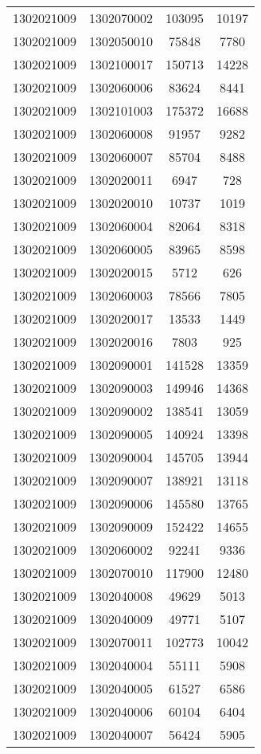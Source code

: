 \begin{longtable}[h]{llcc}
		1302021009 & 1302070002 & 103095 & 10197\\
		1302021009 & 1302050010 & 75848 & 7780\\
		1302021009 & 1302100017 & 150713 & 14228\\
		1302021009 & 1302060006 & 83624 & 8441\\
		1302021009 & 1302101003 & 175372 & 16688\\
		1302021009 & 1302060008 & 91957 & 9282\\
		1302021009 & 1302060007 & 85704 & 8488\\
		1302021009 & 1302020011 & 6947 & 728\\
		1302021009 & 1302020010 & 10737 & 1019\\
		1302021009 & 1302060004 & 82064 & 8318\\
		1302021009 & 1302060005 & 83965 & 8598\\
		1302021009 & 1302020015 & 5712 & 626\\
		1302021009 & 1302060003 & 78566 & 7805\\
		1302021009 & 1302020017 & 13533 & 1449\\
		1302021009 & 1302020016 & 7803 & 925\\
		1302021009 & 1302090001 & 141528 & 13359\\
		1302021009 & 1302090003 & 149946 & 14368\\
		1302021009 & 1302090002 & 138541 & 13059\\
		1302021009 & 1302090005 & 140924 & 13398\\
		1302021009 & 1302090004 & 145705 & 13944\\
		1302021009 & 1302090007 & 138921 & 13118\\
		1302021009 & 1302090006 & 145580 & 13765\\
		1302021009 & 1302090009 & 152422 & 14655\\
		1302021009 & 1302060002 & 92241 & 9336\\
		1302021009 & 1302070010 & 117900 & 12480\\
		1302021009 & 1302040008 & 49629 & 5013\\
		1302021009 & 1302040009 & 49771 & 5107\\
		1302021009 & 1302070011 & 102773 & 10042\\
		1302021009 & 1302040004 & 55111 & 5908\\
		1302021009 & 1302040005 & 61527 & 6586\\
		1302021009 & 1302040006 & 60104 & 6404\\
		1302021009 & 1302040007 & 56424 & 5905\\

\end{longtable}
